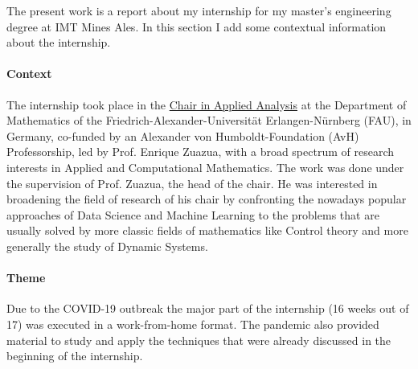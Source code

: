 \documentclass[12pt, letterpaper]{article}
\begin{document}
The present work is a report about my internship for my master's engineering degree at IMT Mines Ales. In this section I add some contextual information about the internship.

\paragraph{Context} The internship took place in the \href{https://en.www.math.fau.de/applied-analysis/}{Chair 
in Applied Analysis} at the Department of Mathematics of the Friedrich-Alexander-Universität Erlangen-Nürnberg (FAU), in Germany, co-funded by an Alexander von Humboldt-Foundation (AvH) Professorship, led by Prof. Enrique Zuazua, with a broad spectrum of research interests in Applied and Computational Mathematics. 
The work was done under the supervision of Prof. Zuazua, the head of the chair. 
He was interested in broadening the field of research of his chair by confronting the nowadays popular approaches of Data Science and Machine Learning to the problems that are usually solved by more classic fields of mathematics like Control theory and more generally the study of Dynamic Systems. 

\paragraph{Theme} Due to the COVID-19 outbreak the major part of the internship (16 weeks out of 17) was executed in a work-from-home format. 
The pandemic also provided material to study and apply the techniques that were already discussed in the beginning of the internship.
 
\end{document}
